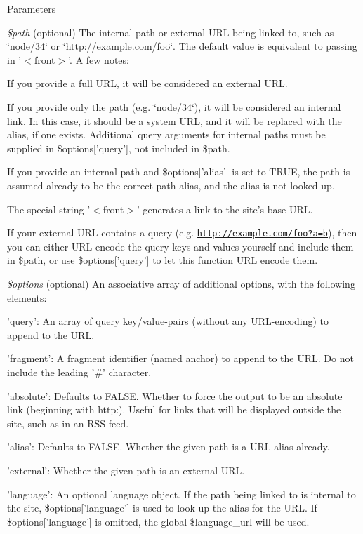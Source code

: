 \begin{DoxyParams}{Parameters}
\item[{\em \$path}](optional) The internal path or external URL being linked to, such as \char`\"{}node/34\char`\"{} or \char`\"{}http://example.com/foo\char`\"{}. The default value is equivalent to passing in '$<$front$>$'. A few notes:
\begin{DoxyItemize}
\item If you provide a full URL, it will be considered an external URL.
\item If you provide only the path (e.g. \char`\"{}node/34\char`\"{}), it will be considered an internal link. In this case, it should be a system URL, and it will be replaced with the alias, if one exists. Additional query arguments for internal paths must be supplied in \$options\mbox{[}'query'\mbox{]}, not included in \$path.
\item If you provide an internal path and \$options\mbox{[}'alias'\mbox{]} is set to TRUE, the path is assumed already to be the correct path alias, and the alias is not looked up.
\item The special string '$<$front$>$' generates a link to the site's base URL.
\item If your external URL contains a query (e.g. \href{http://example.com/foo?a=b}{\tt http://example.com/foo?a=b}), then you can either URL encode the query keys and values yourself and include them in \$path, or use \$options\mbox{[}'query'\mbox{]} to let this function URL encode them. 
\end{DoxyItemize}\item[{\em \$options}](optional) An associative array of additional options, with the following elements:
\begin{DoxyItemize}
\item 'query': An array of query key/value-\/pairs (without any URL-\/encoding) to append to the URL.
\item 'fragment': A fragment identifier (named anchor) to append to the URL. Do not include the leading '\#' character.
\item 'absolute': Defaults to FALSE. Whether to force the output to be an absolute link (beginning with http:). Useful for links that will be displayed outside the site, such as in an RSS feed.
\item 'alias': Defaults to FALSE. Whether the given path is a URL alias already.
\item 'external': Whether the given path is an external URL.
\item 'language': An optional language object. If the path being linked to is internal to the site, \$options\mbox{[}'language'\mbox{]} is used to look up the alias for the URL. If \$options\mbox{[}'language'\mbox{]} is omitted, the global \$language\_\-url will be used.

\end{DoxyItemize}
\end{DoxyParams}
